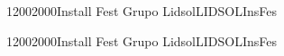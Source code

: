 \documentclass[a4paper,10pt]{report}
\begin{document}
\begin{landscape}
\begin{timetable}
 
   
   
   
   
   
   
  {1200}{2000}{Install Fest }{Grupo Lidsol}{{\tiny LIDSOL}}{InsFes}
   
    
   
   
   
   
     {1200}{2000}{Install Fest }{Grupo Lidsol}{{\tiny LIDSOL}}{InsFes}
   
 
  
  
   


 
 
   
     
   
   
   
  
   
  
  
    
   
 \end{timetable}
 \end{landscape}
 
\end{document}
